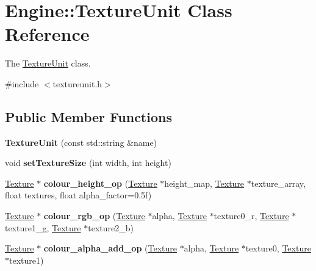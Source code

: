 \hypertarget{classEngine_1_1TextureUnit}{}\section{Engine\+:\+:Texture\+Unit Class Reference}
\label{classEngine_1_1TextureUnit}


The \hyperlink{classEngine_1_1TextureUnit}{Texture\+Unit} class.  




{\ttfamily \#include $<$textureunit.\+h$>$}

\subsection*{Public Member Functions}
\begin{DoxyCompactItemize}
\item 
\hypertarget{classEngine_1_1TextureUnit_a65b91cac81f8c3c7a23c12763bc73c36}{}{\bfseries Texture\+Unit} (const std\+::string \&name)\label{classEngine_1_1TextureUnit_a65b91cac81f8c3c7a23c12763bc73c36}

\item 
\hypertarget{classEngine_1_1TextureUnit_a16fc77d4cdc9d99bb6ded72f93ab0db9}{}void {\bfseries set\+Texture\+Size} (int width, int height)\label{classEngine_1_1TextureUnit_a16fc77d4cdc9d99bb6ded72f93ab0db9}

\item 
\hypertarget{classEngine_1_1TextureUnit_ad6ff17d57d78e16d86c6369d42b79c43}{}\hyperlink{classEngine_1_1Texture}{Texture} $\ast$ {\bfseries colour\+\_\+height\+\_\+op} (\hyperlink{classEngine_1_1Texture}{Texture} $\ast$height\+\_\+map, \hyperlink{classEngine_1_1Texture}{Texture} $\ast$texture\+\_\+array, float textures, float alpha\+\_\+factor=0.\+5f)\label{classEngine_1_1TextureUnit_ad6ff17d57d78e16d86c6369d42b79c43}

\item 
\hypertarget{classEngine_1_1TextureUnit_a43f05c3947d44cab2eeb090da6f8b18b}{}\hyperlink{classEngine_1_1Texture}{Texture} $\ast$ {\bfseries colour\+\_\+rgb\+\_\+op} (\hyperlink{classEngine_1_1Texture}{Texture} $\ast$alpha, \hyperlink{classEngine_1_1Texture}{Texture} $\ast$texture0\+\_\+r, \hyperlink{classEngine_1_1Texture}{Texture} $\ast$texture1\+\_\+g, \hyperlink{classEngine_1_1Texture}{Texture} $\ast$texture2\+\_\+b)\label{classEngine_1_1TextureUnit_a43f05c3947d44cab2eeb090da6f8b18b}

\item 
\hypertarget{classEngine_1_1TextureUnit_a0f7d972b66b18e25f85e4c141c19d54b}{}\hyperlink{classEngine_1_1Texture}{Texture} $\ast$ {\bfseries colour\+\_\+alpha\+\_\+add\+\_\+op} (\hyperlink{classEngine_1_1Texture}{Texture} $\ast$alpha, \hyperlink{classEngine_1_1Texture}{Texture} $\ast$texture0, \hyperlink{classEngine_1_1Texture}{Texture} $\ast$texture1)\label{classEngine_1_1TextureUnit_a0f7d972b66b18e25f85e4c141c19d54b}


\end{DoxyCompactItemize}
